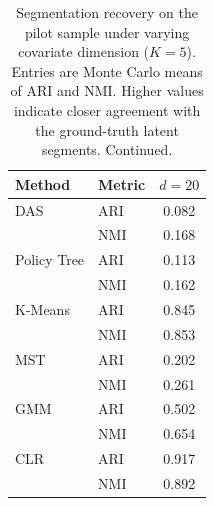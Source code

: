 \begin{table}[htbp]
\centering
\caption{Segmentation recovery on the pilot sample under varying covariate dimension ($K=5$). Entries are Monte Carlo means of ARI and NMI. Higher values indicate closer agreement with the ground-truth latent segments. Continued.}
\label{tab:app-ari-nmi-varying-d-cont}
\begin{tabular}{llc}
\toprule
Method & Metric & $d=20$ \\
\midrule
DAS & ARI & 0.082 \\
 & NMI & 0.168 \\
\addlinespace
Policy Tree & ARI & 0.113 \\
 & NMI & 0.162 \\
\addlinespace
K-Means & ARI & 0.845 \\
 & NMI & 0.853 \\
\addlinespace
MST & ARI & 0.202 \\
 & NMI & 0.261 \\
\addlinespace
GMM & ARI & 0.502 \\
 & NMI & 0.654 \\
\addlinespace
CLR & ARI & 0.917 \\
 & NMI & 0.892 \\
\bottomrule
\end{tabular}
\end{table}
